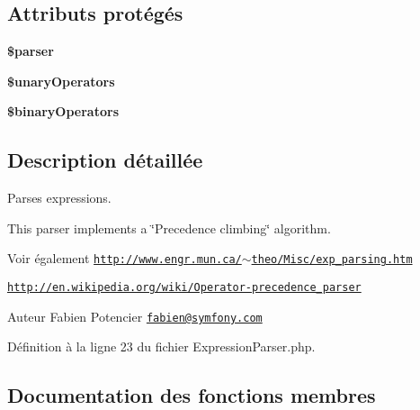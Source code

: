 \subsection*{Attributs protégés}
\begin{DoxyCompactItemize}
\item 
{\bfseries \$parser}\hypertarget{class_twig___expression_parser_a147a766daa03d52576c7345fea31c945}{}\label{class_twig___expression_parser_a147a766daa03d52576c7345fea31c945}

\item 
{\bfseries \$unary\+Operators}\hypertarget{class_twig___expression_parser_ae627d836785e9074fdd05ea18ed73415}{}\label{class_twig___expression_parser_ae627d836785e9074fdd05ea18ed73415}

\item 
{\bfseries \$binary\+Operators}\hypertarget{class_twig___expression_parser_a0daebcbd551638ff610aee2905c70974}{}\label{class_twig___expression_parser_a0daebcbd551638ff610aee2905c70974}

\end{DoxyCompactItemize}


\subsection{Description détaillée}
Parses expressions.

This parser implements a \char`\"{}\+Precedence climbing\char`\"{} algorithm.

\begin{DoxySeeAlso}{Voir également}
\href{http://www.engr.mun.ca/~theo/Misc/exp_parsing.htm}{\tt http\+://www.\+engr.\+mun.\+ca/$\sim$theo/\+Misc/exp\+\_\+parsing.\+htm} 

\href{http://en.wikipedia.org/wiki/Operator-precedence_parser}{\tt http\+://en.\+wikipedia.\+org/wiki/\+Operator-\/precedence\+\_\+parser}
\end{DoxySeeAlso}
\begin{DoxyAuthor}{Auteur}
Fabien Potencier \href{mailto:fabien@symfony.com}{\tt fabien@symfony.\+com} 
\end{DoxyAuthor}


Définition à la ligne 23 du fichier Expression\+Parser.\+php.



\subsection{Documentation des fonctions membres}
